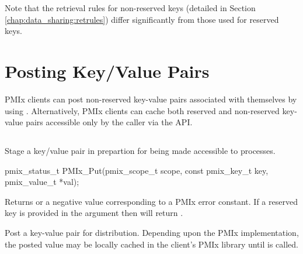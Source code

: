 Note that the retrieval rules for non-reserved keys (detailed in Section 
\ref{chap:data_sharing:retrules}) differ significantly from those used for reserved keys.


\section{Posting Key/Value Pairs}
\label{chap:data_sharing:set}

\ac{PMIx} clients can post non-reserved key-value pairs associated with themselves by using . Alternatively, \ac{PMIx} clients can cache both reserved and non-reserved key-value pairs accessible only by the caller via the  \ac{API}.


\subsection{}

\summary

Stage a key/value pair in prepartion for being made accessible to processes.

\format

\cspecificstart
\begin{codepar}
pmix_status_t
PMIx_Put(pmix_scope_t scope,
         const pmix_key_t key,
         pmix_value_t *val);
\end{codepar}
\cspecificend

\begin{arglist}
\end{arglist}

Returns  or a negative value corresponding to a \ac{PMIx} error constant.
If a reserved key is provided in the  argument then  will return .

\descr

Post a key-value pair for distribution. Depending upon the \ac{PMIx} implementation, the posted value may be locally cached in the client's \ac{PMIx} library until  is called.

